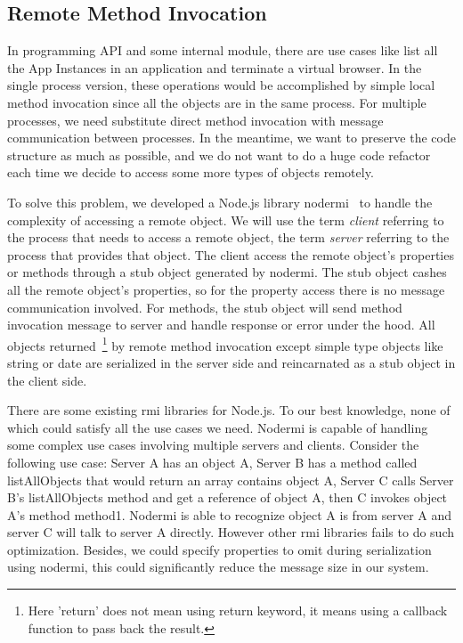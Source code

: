\subsection{Remote Method Invocation}
In \cb{} programming API and some internal module, there are use cases like list all the App Instances in an application
and terminate a virtual browser.
In the single process version, these operations would be accomplished by simple local method invocation
since all the objects are in the same process.
For multiple processes,
we need substitute direct method invocation with message communication between processes.
In the meantime, we want to preserve the code structure as much as possible,
and we do not want to do a huge code refactor each time we decide to access some more types of objects remotely.


To solve this problem,
we developed a Node.js library nodermi~\cite{nodermi} to handle the complexity of accessing a remote object.
We will use the term \emph{client} referring to the process that needs to access a remote object,
the term \emph{server} referring to the process that provides that object.
The client access the remote object's properties or methods through a stub object generated by nodermi.
The stub object cashes all the remote object's properties,
so for the property access there is no message communication involved.
For methods,
the stub object will send method invocation message to server and handle response or error under the hood.
All objects returned~\footnote{Here 'return' does not mean using return keyword, it means using a callback function to pass back the result.} by remote method invocation
 except simple type objects like string or date are serialized in the server side
 and reincarnated as a stub object in the client side.

There are some existing rmi libraries for Node.js.
To our best knowledge, none of which could satisfy all the use cases we need.
Nodermi is capable of handling some complex use cases involving multiple servers and clients.
Consider the following use case:
Server A has an object A,
Server B has a method called listAllObjects that would return an array contains object A,
Server C calls Server B's listAllObjects method and get a reference of object A,
then C invokes object A's method method1.
Nodermi is able to recognize object A is from server A and server C will talk to server A directly.
However other rmi libraries fails to do such optimization.
Besides, we could specify properties to omit during serialization using nodermi,
this could significantly reduce the message size in our system.

